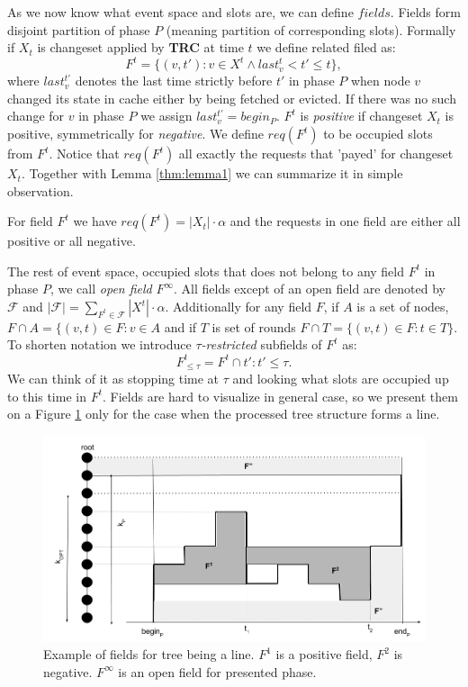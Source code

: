 As we now know what event space and slots are, we can define $fields$. Fields 
form disjoint partition of phase $P$ (meaning partition of corresponding 
slots). Formally if $X_t$ is changeset applied by \textbf{TRC} at time $t$ we 
define related filed as:
$$ F^t = \{(v, t'): v \in X^t \wedge last_v^t < t' \leq t\},$$
where $last_v^{t'}$ denotes the last time strictly before $t'$ in phase $P$ 
when node $v$ changed its state in cache either by being fetched or evicted. If 
there was no such change for $v$ in phase $P$ we assign $last_v^{t'} = begin_P$.
$F^t$ is \textit{positive} if changeset $X_t$ is positive, symmetrically for 
\textit{negative}. We define $req(F^t)$ to be occupied slots from $F^t$. Notice 
that $req(F^t)$ all exactly the requests that 'payed' for changeset $X_t$. 
Together with Lemma \ref{thm:lemma1} we can summarize it in simple observation.
\begin{observe}
For field $F^t$ we have $req(F^t) = |X_t| \cdot \alpha$ and the requests 
in one field are either all positive or all negative.
\label{obs:observe1}
\end{observe}
The rest of event space, occupied slots that does not belong to any field $F^t$ 
in phase $P$, we call \textit{open field} $F^{\infty}$. All fields except of 
an 
open field are denoted by $\mathcal{F}$ and $|\mathcal{F}| = \sum_{F^t \in 
\mathcal{F}} |X^t| \cdot \alpha$.
Additionally for any field $F$, if $A$ is a set of nodes, $F \cap A = \{(v,t) 
\in F: v \in A$ and if $T$ is set of rounds $F \cap T = \{(v, t) \in F: t \in 
T\}$. To shorten notation we introduce $\tau$\textit{-restricted} subfields of 
$F^t$ as:
$$F^t_{\leq \tau} = F^t \cap {t': t' \leq \tau}.$$
We can think of it as stopping time at $\tau$ and looking what slots are 
occupied up to this time in $F^t$.
Fields are hard to visualize in general case, so we present them on a 
Figure \ref{fig:fields} only for the case when the processed tree structure 
forms a line.
\begin{figure}
\label{fig:fields}
\begin{center}
  \includegraphics[width=1.1\textwidth]{fields.png}
\end{center}
\caption{Example of fields for tree being a line. $F^1$ is a positive field, 
$F^2$ is negative. $F^{\infty}$ is an open field for presented phase.}
\end{figure}

